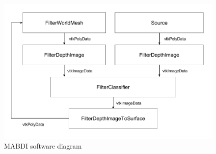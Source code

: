 \begin{figure}[h]%
\centering
\includegraphics[width=.5\textwidth]{figures/diagram_software.png}
\caption{MABDI software diagram}
\label{fig:software}
\end{figure}
